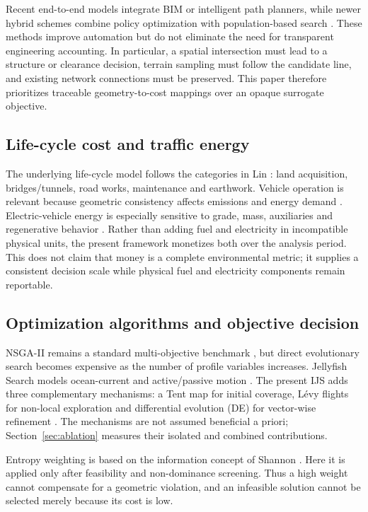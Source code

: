 \documentclass[preprint,12pt]{elsarticle}
\begin{document}
Recent end-to-end models integrate BIM or intelligent path planners, while newer hybrid schemes combine policy optimization with population-based search \cite{han2023,pu2024,pu2026}. These methods improve automation but do not eliminate the need for transparent engineering accounting. In particular, a spatial intersection must lead to a structure or clearance decision, terrain sampling must follow the candidate line, and existing network connections must be preserved. This paper therefore prioritizes traceable geometry-to-cost mappings over an opaque surrogate objective.

\subsection{Life-cycle cost and traffic energy}

The underlying life-cycle model follows the categories in Lin \cite{lin2025}: land acquisition, bridges/tunnels, road works, maintenance and earthwork. Vehicle operation is relevant because geometric consistency affects emissions and energy demand \cite{llopis2019}. Electric-vehicle energy is especially sensitive to grade, mass, auxiliaries and regenerative behavior \cite{dimartino2022}. Rather than adding fuel and electricity in incompatible physical units, the present framework monetizes both over the analysis period. This does not claim that money is a complete environmental metric; it supplies a consistent decision scale while physical fuel and electricity components remain reportable.

\subsection{Optimization algorithms and objective decision}

NSGA-II remains a standard multi-objective benchmark \cite{deb2002}, but direct evolutionary search becomes expensive as the number of profile variables increases. Jellyfish Search models ocean-current and active/passive motion \cite{chou2021}. The present IJS adds three complementary mechanisms: a Tent map for initial coverage, L\'evy flights for non-local exploration and differential evolution (DE) for vector-wise refinement \cite{storn1997}. The mechanisms are not assumed beneficial a priori; Section~\ref{sec:ablation} measures their isolated and combined contributions.

Entropy weighting is based on the information concept of Shannon \cite{shannon1948}. Here it is applied only after feasibility and non-dominance screening. Thus a high weight cannot compensate for a geometric violation, and an infeasible solution cannot be selected merely because its cost is low.
\end{document}
